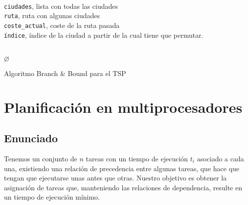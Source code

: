 \documentclass[a4paper, 11pt]{article} %
\let\emptyset\varnothing
\begin{document}
    \begin{algorithm}[H]
    	\begin{algorithmic}[1]
		\REQUIRE \ \\
          \texttt{ciudades}, lista con todas las ciudades \\
          \texttt{ruta}, ruta con algunas ciudades \\
          \texttt{coste\_actual}, coste de la ruta pasada \\
          \texttt{índice}, índice de la ciudad a partir de la cual tiene que permutar. \\\



	      \ENDIF
	      \RETURN $\emptyset$
	    \ELSE
	        
	        
	      \ENDFOR
	    \ENDIF
    	\end{algorithmic}
        \caption{Algoritmo Branch \& Bound para el TSP}
        \label{BBound-TSP}
    \end{algorithm}

\section{Planificación en multiprocesadores}
  \subsection{Enunciado}
  Tenemos un conjunto de $n$ tareas con un tiempo de ejecución $t_i$ asociado a cada una, existiendo una relación de precedencia
  entre algunas tareas, que hace que tengan que ejecutarse unas antes que otras. Nuestro objetivo es obtener la asignación de 
  tareas que, manteniendo las relaciones de dependencia, resulte en un tiempo de ejecución mínimo. 
  
\end{document}
